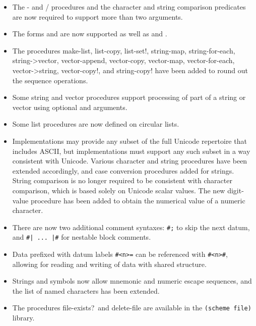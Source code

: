 \begin{itemize}
\item The {\cf -} and {\cf /} procedures
and the character and string comparison
predicates are now required to support more than two arguments.

\item The forms \sharptrue{} and \sharpfalse{} are now supported
as well as \schtrue{} and \schfalse{}.

\item The procedures {\cf make-list}, {\cf list-copy}, {\cf list-set!},
{\cf string-map}, {\cf string-for-each}, {\cf string->vector}, 
{\cf vector-append},
{\cf vector-copy}, {\cf vector-map}, {\cf vector-for-each}, 
{\cf vector->string}, {\cf vector-copy!}, and {\cf string-copy!}
have been added to round out the sequence operations.

\item Some string and vector procedures support processing of part of a string or vector using
optional  and  arguments.

\item Some list procedures are now defined on circular lists.

\item Implementations may provide any subset of the full Unicode
repertoire that includes ASCII, but implementations must support any
such subset in a way consistent with Unicode.
Various character and string procedures have been extended accordingly,
and case conversion procedures added for strings.
String comparison is no longer
required to be consistent with character comparison, which is based
solely on Unicode scalar values.
The new {\cf digit-value} procedure has been added to obtain the numerical
value of a numeric character.

\item There are now two additional comment syntaxes: {\tt \#;} to
skip the next datum, and {\tt \#| ... |\#}
for nestable block comments.

\item Data prefixed with datum labels {\tt \#<n>=} can be referenced
with {\tt \#<n>\#}, allowing for reading and writing of data with
shared structure.

\item Strings and symbols now allow mnemonic and numeric escape
sequences, and the list of named characters has been extended.

\item The procedures {\cf file-exists?}\ and {\cf delete-file} are available in the
{\tt (scheme file)} library.


\end{itemize}
